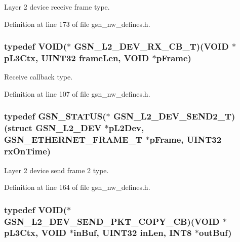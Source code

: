 Layer 2 device receive frame type. 



Definition at line 173 of file gsn\_\-nw\_\-defines.h.

\hypertarget{a00670_ga528d617c85be4b1aed82ce677f941587}{
\subsubsection[{GSN\_\-L2\_\-DEV\_\-RX\_\-CB\_\-T}]{\setlength{\rightskip}{0pt plus 5cm}typedef VOID($\ast$  {\bf GSN\_\-L2\_\-DEV\_\-RX\_\-CB\_\-T})(VOID $\ast$pL3Ctx, {\bf UINT32} frameLen, VOID $\ast$pFrame)}}
\label{a00670_ga528d617c85be4b1aed82ce677f941587}


Receive callback type. 



Definition at line 107 of file gsn\_\-nw\_\-defines.h.

\hypertarget{a00670_ga6bea88ae2a22023e68f1b064e1455411}{
\subsubsection[{GSN\_\-L2\_\-DEV\_\-SEND2\_\-T}]{\setlength{\rightskip}{0pt plus 5cm}typedef {\bf GSN\_\-STATUS}($\ast$ {\bf GSN\_\-L2\_\-DEV\_\-SEND2\_\-T})(struct {\bf GSN\_\-L2\_\-DEV} $\ast$pL2Dev, {\bf GSN\_\-ETHERNET\_\-FRAME\_\-T} $\ast$pFrame, {\bf UINT32} rxOnTime)}}
\label{a00670_ga6bea88ae2a22023e68f1b064e1455411}


Layer 2 device send frame 2 type. 



Definition at line 164 of file gsn\_\-nw\_\-defines.h.

\hypertarget{a00670_ga6c639d0fa9b75482d68bfa97834a0ca9}{
\subsubsection[{GSN\_\-L2\_\-DEV\_\-SEND\_\-PKT\_\-COPY\_\-CB}]{\setlength{\rightskip}{0pt plus 5cm}typedef VOID($\ast$ {\bf GSN\_\-L2\_\-DEV\_\-SEND\_\-PKT\_\-COPY\_\-CB})(VOID $\ast$pL3Ctx, VOID $\ast$inBuf, {\bf UINT32} inLen, {\bf INT8} $\ast$outBuf)}}
\label{a00670_ga6c639d0fa9b75482d68bfa97834a0ca9}


